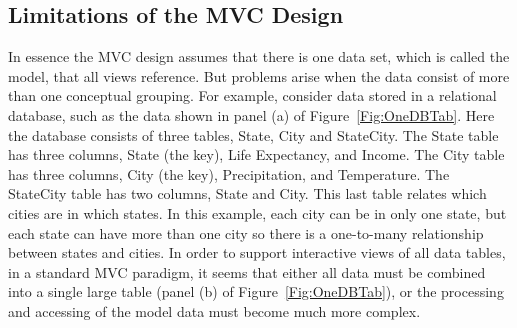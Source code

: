 \documentclass[11pt]{article}
\newcommand{\Rpackage}[1]{{\textit{#1}}}
\begin{document}

\subsection{Limitations of the MVC Design}\label{Ssec:Limit}

In essence the MVC design assumes that there is one data set, which is
called the model, that all views reference.  But problems arise when
the data consist of more than one conceptual grouping.  For example,
consider data stored in a relational database, such as the data shown in
panel (a) of Figure~\ref{Fig:OneDBTab}.  Here the database
consists of three tables, State, City and StateCity.  The State table
has three columns, State (the key), Life Expectancy, and Income.  The
City table has three columns, City (the key), Precipitation, and
Temperature.  The StateCity table has two columns, State and City.
This last table relates which cities are in which states.  In this
example, each city can be in only one state, but each state can have
more than one city so there is a one-to-many relationship between
states and cities.  In order to support interactive views of all data
tables, in a standard MVC paradigm, it seems that either all data must
be combined into a single large table (panel (b) of Figure~\ref{Fig:OneDBTab}), or
the processing and accessing of the model data must become much more
complex. 

\end{document}
